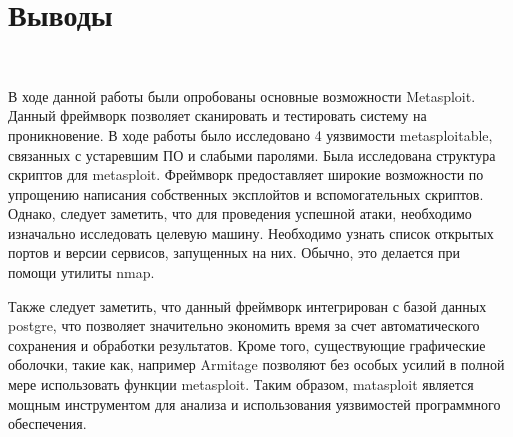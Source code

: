 \documentclass{article}
\begin{document}
\section{Выводы}
~

В ходе данной работы были опробованы основные возможности Metasploit. Данный фреймворк позволяет сканировать и тестировать систему на проникновение. В ходе работы было исследовано 4 уязвимости metasploitable, связанных с устаревшим ПО и слабыми паролями. Была исследована структура скриптов для metasploit. Фреймворк предоставляет широкие возможности по упрощению написания собственных эксплойтов и вспомогательных скриптов. Однако, следует заметить, что для проведения успешной атаки, необходимо изначально исследовать целевую машину. Необходимо узнать список открытых портов и версии сервисов, запущенных на них. Обычно, это делается при помощи утилиты nmap. 

Также следует заметить, что данный фреймворк интегрирован с базой данных postgre, что позволяет значительно экономить время за счет автоматического сохранения и обработки результатов. Кроме того, существующие графические оболочки, такие как, например Armitage позволяют без особых усилий в полной мере использовать функции metasploit. Таким образом, matasploit является мощным инструментом для анализа и использования уязвимостей программного обеспечения.
 
\end{document}
